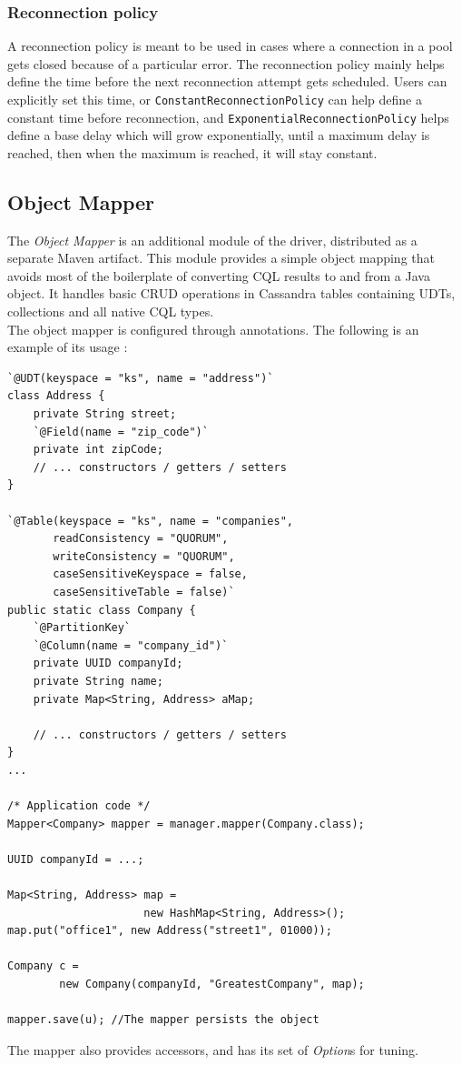 \documentclass[a4paper]{report}
\newcommand{\om}{\emph{Object Mapper\xspace}}
\begin{document}
\subsubsection{Reconnection policy}
A reconnection policy is meant to be used in cases where a connection in a pool gets closed because of a particular error. The reconnection policy mainly helps define the time before the next reconnection attempt gets scheduled. Users can explicitly set this time, or \verb;ConstantReconnectionPolicy; can help define a constant time before reconnection, and \verb;ExponentialReconnectionPolicy; helps define a base delay which will grow exponentially, until a maximum delay is reached, then when the maximum is reached, it will stay constant.

\subsection{Object Mapper}
The \om{} is an additional module of the driver, distributed as a separate Maven artifact. This module provides a simple object mapping that avoids most of the boilerplate of converting CQL results to and from a Java object. It handles basic CRUD operations in Cassandra tables containing UDTs, collections and all native CQL types.\\
The object mapper is configured through annotations. The following is an example of its usage : 

\begin{lstlisting}[label=om-ex-1, caption=Object Mapper example, style=Java]
`@UDT(keyspace = "ks", name = "address")`
class Address {
    private String street;
    `@Field(name = "zip_code")`
    private int zipCode;
    // ... constructors / getters / setters
}

`@Table(keyspace = "ks", name = "companies",
       readConsistency = "QUORUM",
       writeConsistency = "QUORUM",
       caseSensitiveKeyspace = false,
       caseSensitiveTable = false)`
public static class Company {
    `@PartitionKey`
    `@Column(name = "company_id")`
    private UUID companyId;
    private String name;
    private Map<String, Address> aMap;

    // ... constructors / getters / setters
}
...

/* Application code */
Mapper<Company> mapper = manager.mapper(Company.class);

UUID companyId = ...;

Map<String, Address> map = 
                     new HashMap<String, Address>();
map.put("office1", new Address("street1", 01000));

Company c = 
        new Company(companyId, "GreatestCompany", map);

mapper.save(u); //The mapper persists the object
\end{lstlisting}
The mapper also provides accessors, and has its set of \emph{Option}s for tuning.
\end{document}
